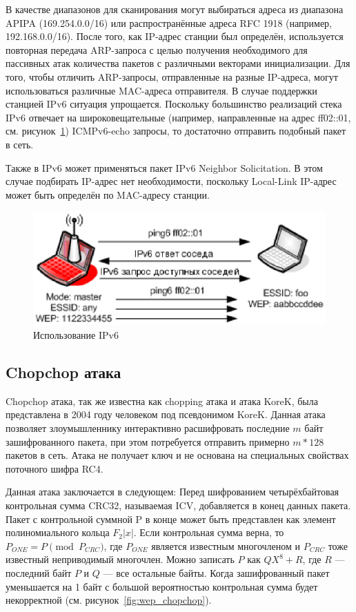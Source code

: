 В качестве диапазонов для сканирования могут выбираться адреса из диапазона
APIPA (169.254.0.0/16) или распространённые адреса RFC 1918 (например,
192.168.0.0/16). После того, как IP-адрес станции был определён, используется
повторная передача ARP-запроса с целью получения необходимого для пассивных атак
количества пакетов с различными векторами инициализации. Для того, чтобы
отличить ARP-запросы, отправленные на разные IP-адреса, могут использоваться
различные MAC-адреса отправителя. В случае поддержки станцией IPv6 ситуация
упрощается. Поскольку большинство реализаций стека IPv6 отвечает на
широковещательные (например, направленные на адрес ff02::01, см.
рисунок~\ref{fig:ipv6_usage}) ICMPv6-echo запросы, то достаточно отправить
подобный пакет в сеть.

Также в IPv6 может применяться пакет IPv6 Neighbor Solicitation. В этом случае
подбирать IP-адрес нет необходимости, поскольку Local-Link IP-адрес может быть
определён по MAC-адресу станции.

\begin{figure}
    \includegraphics[width=1\textwidth]{graphics/ipv6_usage.eps}
    \caption{Использование IPv6}
    \label{fig:ipv6_usage}
\end{figure}

\subsection{Chopchop атака}

Chopchop атака, так же известна как chopping атака и атака KoreK, была
представлена в 2004 году человеком под псевдонимом KoreK. Данная атака позволяет
злоумышленнику интерактивно расшифровать последние $m$ байт зашифрованного
пакета, при этом потребуется отправить примерно $m*128$ пакетов в сеть. Атака не
получает ключ и не основана на специальных свойствах поточного шифра RC4.

Данная атака заключается в следующем: Перед шифрованием четырёхбайтовая
контрольная сумма CRC32, называемая ICV, добавляется в конец данных пакета. Пакет
с контрольной суммной P в конце может быть представлен как элемент
полиномиального кольца $F_2 |x|$. Если контрольная сумма верна, то $ P_{ONE} =
P\pmod{P_{CRC}}$, где $P_{ONE}$ является известным многочленом и $P_{CRC}$ тоже
известный неприводимый многочлен. Можно записать $P$ как $Q X^8 + R$, где $R$
--- последний байт $P$ и $Q$ --- все остальные байты. Когда зашифрованный пакет
  уменьшается на 1 байт с большой вероятностью контрольная сумма будет
  некорректной (см. рисунок~\ref{fig:wep_chopchop}).

